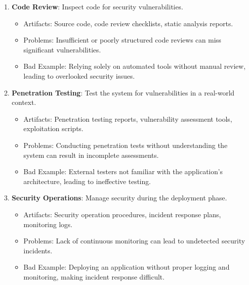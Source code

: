 {\begin{enumerate}
\begin{itemize}
                \item Problems: Inadequate testing of high-risk areas may leave critical vulnerabilities untested.
                \item Bad Example: Conducting extensive tests on low-risk features while neglecting authentication mechanisms.
            \end{itemize}
        \item \textbf{Code Review}: Inspect code for security vulnerabilities.
            \begin{itemize}
                \item Artifacts: Source code, code review checklists, static analysis reports.
                \item Problems: Insufficient or poorly structured code reviews can miss significant vulnerabilities.
                \item Bad Example: Relying solely on automated tools without manual review, leading to overlooked security issues.
            \end{itemize}
        \item \textbf{Penetration Testing}: Test the system for vulnerabilities in a real-world context.
            \begin{itemize}
                \item Artifacts: Penetration testing reports, vulnerability assessment tools, exploitation scripts.
                \item Problems: Conducting penetration tests without understanding the system can result in incomplete assessments.
                \item Bad Example: External testers not familiar with the application’s architecture, leading to ineffective testing.
            \end{itemize}
        \item \textbf{Security Operations}: Manage security during the deployment phase.
            \begin{itemize}
                \item Artifacts: Security operation procedures, incident response plans, monitoring logs.
                \item Problems: Lack of continuous monitoring can lead to undetected security incidents.
                \item Bad Example: Deploying an application without proper logging and monitoring, making incident response difficult.
            \end{itemize}
    \end{enumerate}
}


